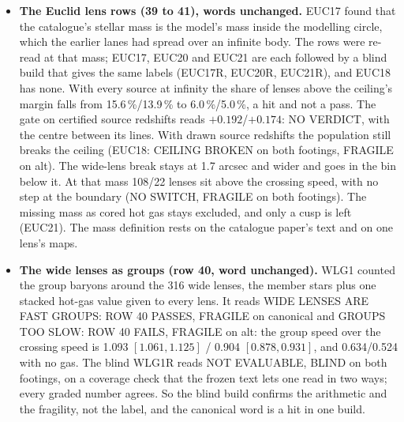 \documentclass[10pt]{article}
\begin{document}
\begin{itemize}
\item \textbf{The Euclid lens rows (39 to 41), words unchanged.} EUC17 found that the catalogue's stellar mass is the model's mass inside the modelling circle, which the earlier lanes had spread over an infinite body. The rows were re-read at that mass; EUC17, EUC20 and EUC21 are each followed by a blind build that gives the same labels (EUC17R, EUC20R, EUC21R), and EUC18 has none. With every source at infinity the share of lenses above the ceiling's margin falls from 15.6\,\%/13.9\,\% to 6.0\,\%/5.0\,\%, a hit and not a pass. The gate on certified source redshifts reads $+0.192$/$+0.174$: NO VERDICT, with the centre between its lines. With drawn source redshifts the population still breaks the ceiling (EUC18: CEILING BROKEN on both footings, FRAGILE on alt). The wide-lens break stays at 1.7 arcsec and wider and goes in the bin below it. At that mass 108/22 lenses sit above the crossing speed, with no step at the boundary (NO SWITCH, FRAGILE on both footings). The missing mass as cored hot gas stays excluded, and only a cusp is left (EUC21). The mass definition rests on the catalogue paper's text and on one lens's maps.
\item \textbf{The wide lenses as groups (row 40, word unchanged).} WLG1 counted the group baryons around the 316 wide lenses, the member stars plus one stacked hot-gas value given to every lens. It reads WIDE LENSES ARE FAST GROUPS: ROW 40 PASSES, FRAGILE on canonical and GROUPS TOO SLOW: ROW 40 FAILS, FRAGILE on alt: the group speed over the crossing speed is 1.093 $[1.061,1.125]$ / 0.904 $[0.878,0.931]$, and 0.634/0.524 with no gas. The blind WLG1R reads NOT EVALUABLE, BLIND on both footings, on a coverage check that the frozen text lets one read in two ways; every graded number agrees. So the blind build confirms the arithmetic and the fragility, not the label, and the canonical word is a hit in one build.
\end{itemize}
\end{document}
